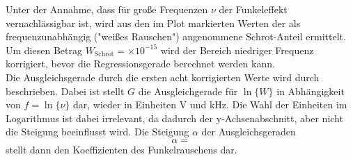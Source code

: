 	Unter der Annahme, dass für große Frequenzen $\nu$ der Funkeleffekt
	vernachlässigbar ist, wird aus den im Plot markierten Werten der als
	frequenzunabhängig ("weißes Rauschen") angenommene Schrot-Anteil ermittelt.
	Um diesen Betrag $W_\text{Schrot}=\times
	10^{-15}$ wird der
	Bereich niedriger Frequenz korrigiert, bevor die Regressionsgerade berechnet
	werden kann.\\

	Die Ausgleichsgerade durch die ersten acht korrigierten Werte wird durch
	\begin{equation}
	
	\end{equation}
	beschrieben. Dabei ist stellt $G$ die Ausgleichgerade für $\ln\{W\}$ in Abhängigkeit 
	von $f=\ln\{\nu\}$ dar, wieder in Einheiten V und kHz. Die Wahl der Einheiten im 
	Logarithmus ist dabei irrelevant, da dadurch der y-Achsenabschnitt, aber nicht 
	die Steigung beeinflusst wird. Die Steigung $\alpha$ der 
	Ausgleichsgeraden
	\begin{equation}
	\alpha = 
	\end{equation}
	stellt dann den Koeffizienten des Funkelrauschens dar.
